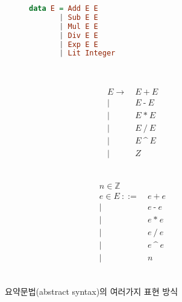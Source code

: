 \begin{figure}[H]\vspace*{-4ex}
\begin{subfigure}[b]{0.3\textwidth}
\begin{lstlisting}[language=Haskell,basicstyle=\linespread{1.1}\ttfamily]
data E = Add E E
       | Sub E E
       | Mul E E
       | Div E E
       | Exp E E
       | Lit Integer
\end{lstlisting}
~\vspace{-3.3ex}
\end{subfigure}
\hfill
\begin{subfigure}[b]{0.3\textwidth}\addtolength{\jot}{-.2em}
\begin{align*}
E  \to ~& E ~\texttt{+}~ E
\\ \mid~& E ~\texttt{-}~ E
\\ \mid~& E ~\texttt{*}~ E
\\ \mid~& E ~\texttt{/}~ E
\\ \mid~& E ~\texttt{\char`^}~ E
\\ \mid~& Z
\end{align*}
~\vspace{-4ex}
\end{subfigure}
\hfill
\begin{subfigure}[b]{0.3\textwidth}\addtolength{\jot}{-.2em}
\begin{align*}
n\in \mathbb{Z} \qquad\;& \\
e\in E ~
   ::= ~& e ~\texttt{+}~ e
\\ \mid~& e ~\texttt{-}~ e
\\ \mid~& e ~\texttt{*}~ e
\\ \mid~& e ~\texttt{/}~ e
\\ \mid~& e ~\texttt{\char`^}~ e
\\ \mid~& n_{\phantom{g}}
\end{align*}
~\vspace{-4ex}
\end{subfigure}
\caption{요약문법(abstract syntax)의 여러가지 표현 방식
         \label{fig:AbsSyn}}
\end{figure}

